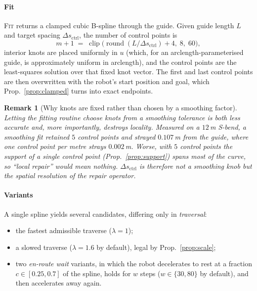 \documentclass[conference]{IEEEtran}
\newtheorem{remark}{Remark}
\begin{document}
\paragraph*{Fit}
\textsc{Fit} returns a clamped cubic B-spline through the guide. Given guide length $L$ and
target spacing $\Delta s_{\text{ctrl}}$, the number of control points is
\begin{equation}
  m+1 \;=\; \operatorname{clip}\!\big(\operatorname{round}(L/\Delta s_{\text{ctrl}}) + 4,\; 8,\; 60\big),
  \label{eq:nctrl}
\end{equation}
interior knots are placed uniformly in $u$ (which, for an arclength-parameterised guide, is
approximately uniform in arclength), and the control points are the least-squares solution
over that fixed knot vector. The first and last control points are then overwritten with
the robot's start position and goal, which Prop.~\ref{prop:clamped} turns into exact
endpoints.

\begin{remark}[Why knots are fixed rather than chosen by a smoothing factor]
\label{rem:knots}
Letting the fitting routine choose knots from a smoothing tolerance is both less accurate
and, more importantly, destroys locality. Measured on a $12$\,m S-bend, a smoothing fit
retained $5$ control points and strayed $0.107$\,m from the guide, where one control point
per metre strays $0.002$\,m. Worse, with $5$ control points the support of a single control
point (Prop.~\ref{prop:support}) spans most of the curve, so ``local repair'' would mean
nothing. $\Delta s_{\text{ctrl}}$ is therefore not a smoothing knob but the
\emph{spatial resolution of the repair operator}.
\end{remark}

\paragraph*{Variants}
A single spline yields several candidates, differing only in \emph{traversal}:
\begin{itemize}
  \item the fastest admissible traverse ($\lambda = 1$);
  \item a slowed traverse ($\lambda = 1.6$ by default), legal by Prop.~\ref{prop:scale};
  \item two \emph{en-route wait} variants, in which the robot decelerates to rest at a
        fraction $c \in [0.25,0.7]$ of the spline, holds for $w$ steps ($w \in \{30,80\}$
        by default), and then accelerates away again.
\end{itemize}
\end{document}
